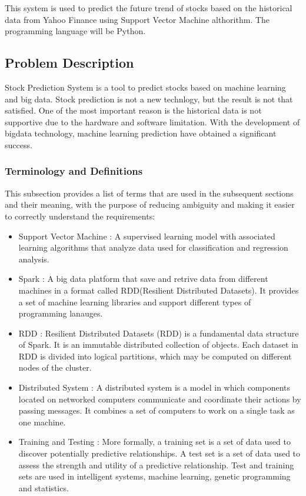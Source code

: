 \documentclass[12pt]{article}
\newcommand{\progname}{Stock Prediction System} %
\begin{document}
This system is used to predict the future trend of stocks based on the historical data from Yahoo Finance using Support Vector Machine althorithm. The programming language will be Python.

\subsection{Problem Description} \label{Sec_pd}

\progname{} is a tool to predict stocks based on machine learning and big data. 
Stock prediction is not a new technlogy, but the result is not that satisfied. One of the most important reason is the historical data is not supportive due to the hardware and software limitation. 
With the development of bigdata technology, machine learning prediction have obtained a significant success. 

\subsubsection{Terminology and  Definitions}

This subsection provides a list of terms that are used in the subsequent
sections and their meaning, with the purpose of reducing ambiguity and making it
easier to correctly understand the requirements:

\begin{itemize}

\item Support Vector Machine  :
A supervised learning model with associated learning algorithms that analyze data used for classification and regression analysis.
\item Spark :
A big data platform that save and retrive data from different machines in a format called RDD(Resilient Distributed Datasets). It provides a set of machine learning libraries and support different types of programming lanauges. 
\item RDD :
Resilient Distributed Datasets (RDD) is a fundamental data structure of Spark. It is an immutable distributed collection of objects. Each dataset in RDD is divided into logical partitions, which may be computed on different nodes of the cluster.
\item Distributed System :
A distributed system is a model in which components located on networked computers communicate and coordinate their actions by passing messages. It combines a set of computers to work on a single task as one machine.
\item Training and Testing :
More formally, a training set is a set of data used to discover potentially predictive relationships. A test set is a set of data used to assess the strength and utility of a predictive relationship. Test and training sets are used in intelligent systems, machine learning, genetic programming and statistics.

\end{itemize}
\end{document}
